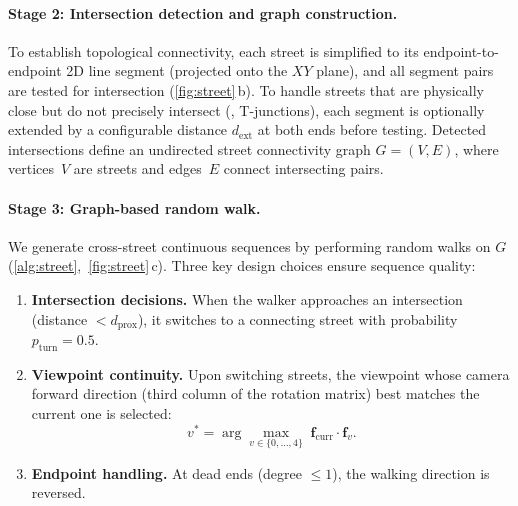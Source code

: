 \paragraph{Stage 2: Intersection detection and graph construction.}
To establish topological connectivity, each street is simplified to its endpoint-to-endpoint 2D line segment (projected onto the $XY$ plane), and all segment pairs are tested for intersection (\cref{fig:street}\,b). To handle streets that are physically close but do not precisely intersect (\eg, T-junctions), each segment is optionally extended by a configurable distance $d_{\mathrm{ext}}$ at both ends before testing. Detected intersections define an undirected street connectivity graph $G = (V, E)$, where vertices~$V$ are streets and edges~$E$ connect intersecting pairs.

\paragraph{Stage 3: Graph-based random walk.}
We generate cross-street continuous sequences by performing random walks on $G$ (\cref{alg:street},~\cref{fig:street}\,c). Three key design choices ensure sequence quality:
\begin{enumerate}[leftmargin=*,nosep]
  \item \textbf{Intersection decisions.} When the walker approaches an intersection (distance $< d_{\mathrm{prox}}$), it switches to a connecting street with probability $p_{\mathrm{turn}} = 0.5$.
  \item \textbf{Viewpoint continuity.} Upon switching streets, the viewpoint whose camera forward direction (third column of the rotation matrix) best matches the current one is selected:
  \begin{equation}
    v^* = \arg\max_{v \in \{0,\dots,4\}} \; \mathbf{f}_{\mathrm{curr}} \cdot \mathbf{f}_{v}.
    \label{eq:viewpoint_select}
  \end{equation}
  \item \textbf{Endpoint handling.} At dead ends (degree $\leq 1$), the walking direction is reversed.
\end{enumerate}


